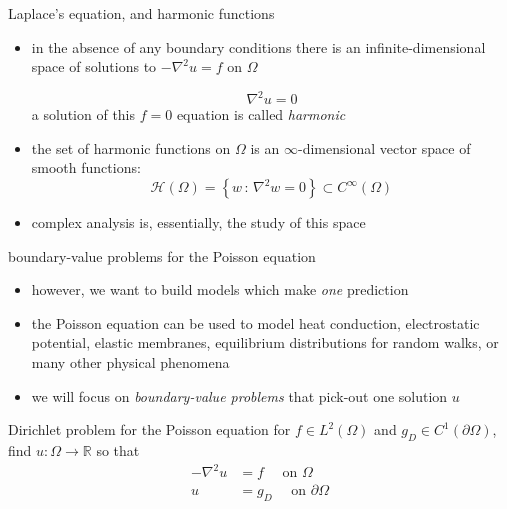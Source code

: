 \documentclass[10pt,
               svgnames,
               hyperref={colorlinks,
                         citecolor=DeepPink4,
                         linkcolor=FireBrick,
                         urlcolor=blue},
               usepdftitle=false]{beamer}
\newcommand{\RR}{\mathbb{R}}
\newcommand{\grad}{\nabla}
\begin{document}
\begin{frame}{Laplace's equation, and harmonic functions}

\begin{itemize}
\item in the absence of any boundary conditions there is an infinite-dimensional space of solutions to $-\grad^2 u = f$ on $\Omega$

\begin{definition}[Laplace's equation $=$ potential equation]
\begin{equation*}
  \grad^2 u = 0
\end{equation*}
a solution of this $f=0$ equation is called \emph{harmonic}
\end{definition}

\item the set of harmonic functions on $\Omega$ is an $\infty$-dimensional vector space of smooth functions:
    $$\mathcal{H}(\Omega) = \left\{w\,:\,\grad^2 w= 0\right\} \subset C^\infty(\Omega)$$
\item complex analysis is, essentially, the study of this space
\end{itemize}
\end{frame}


\begin{frame}{boundary-value problems for the Poisson equation}

\begin{itemize}
\item however, we want to build models which make \emph{one} prediction
\item the Poisson equation can be used to model heat conduction, electrostatic potential, elastic membranes, equilibrium distributions for random walks, or many other physical phenomena
\item we will focus on \emph{boundary-value problems} that pick-out one solution $u$
\end{itemize}

\begin{block}{Dirichlet problem for the Poisson equation}
for $f\in L^2(\Omega)$ and $g_D\in C^1(\partial\Omega)$, find $u:\Omega\to \RR$ so that
\begin{align*}
- \grad^2 u &= f \quad \text{ on } \Omega \\
u &= g_D \quad \text{ on } \partial \Omega
\end{align*}
\end{block}
\end{frame}
\end{document}
